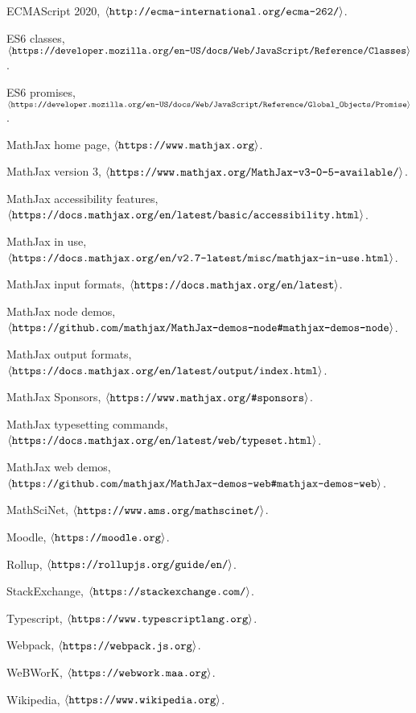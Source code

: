 \documentclass[11pt]{article} %
\def\URL#1{\hbox{\def~{\lower.2em\hbox{\char`\~}}\tt#1}}
\def\url#1{{\small$\left<\URL{#1}\right>$}}
\begin{document}
\begin{thebibliography}{99}

  ECMAScript 2020, \url{http://ecma-international.org/ecma-262/}.

  ES6 classes, \url{https://developer.mozilla.org/en-US/docs/Web/JavaScript/Reference/Classes}.
  
  ES6 promises, \url{https://developer.mozilla.org/en-US/docs/Web/JavaScript/Reference/Global\_Objects/Promise}.

  MathJax home page, \url{https://www.mathjax.org}.

  MathJax version 3, \url{https://www.mathjax.org/MathJax-v3-0-5-available/}.

  MathJax accessibility features, \url{https://docs.mathjax.org/en/latest/basic/accessibility.html}.

  MathJax in use, \url{https://docs.mathjax.org/en/v2.7-latest/misc/mathjax-in-use.html}.

  MathJax input formats, \url{https://docs.mathjax.org/en/latest}.
  
  MathJax node demos, \url{https://github.com/mathjax/MathJax-demos-node\#mathjax-demos-node}.

  MathJax output formats, \url{https://docs.mathjax.org/en/latest/output/index.html}.

  MathJax Sponsors, \url{https://www.mathjax.org/\#sponsors}.

  MathJax typesetting commands, \url{https://docs.mathjax.org/en/latest/web/typeset.html}.

  MathJax web demos, \url{https://github.com/mathjax/MathJax-demos-web\#mathjax-demos-web}.

  MathSciNet, \url{https://www.ams.org/mathscinet/}.

  Moodle, \url{https://moodle.org}.

  Rollup, \url{https://rollupjs.org/guide/en/}.

  StackExchange, \url{https://stackexchange.com/}.

  Typescript, \url{https://www.typescriptlang.org}.

  Webpack, \url{https://webpack.js.org}.

  WeBWorK, \url{https://webwork.maa.org}.

  Wikipedia, \url{https://www.wikipedia.org}.

\end{thebibliography}
\end{document}
